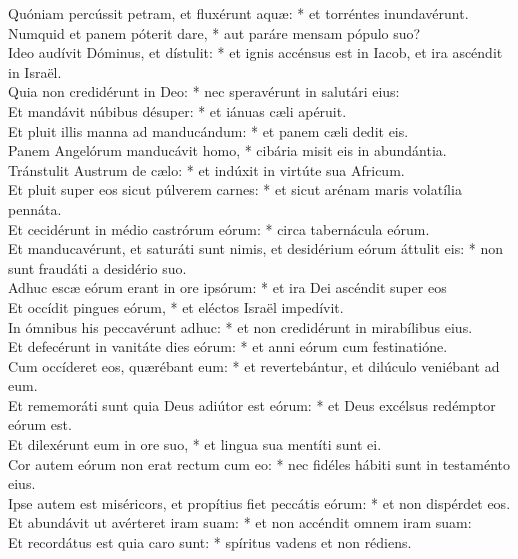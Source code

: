 {	Quóniam percússit petram, et fluxérunt aquæ: * et torréntes inundavérunt. \\
	Numquid et panem póterit dare, * aut paráre mensam pópulo suo? \\
	Ideo audívit Dóminus, et dístulit: * et ignis accénsus est in Iacob, et ira ascéndit in Israël. \\
	Quia non credidérunt in Deo: * nec speravérunt in salutári eius: \\
	Et mandávit núbibus désuper: * et iánuas cæli apéruit. \\
	Et pluit illis manna ad manducándum: * et panem cæli dedit eis. \\
	Panem Angelórum manducávit homo, * cibária misit eis in abundántia. \\
	Tránstulit Austrum de cælo: * et indúxit in virtúte sua Africum. \\
	Et pluit super eos sicut púlverem carnes: * et sicut arénam maris volatília pennáta. \\
	Et cecidérunt in médio castrórum eórum: * circa tabernácula eórum. \\
	Et manducavérunt, et saturáti sunt nimis, et desidérium eórum áttulit eis: * non sunt fraudáti a desidério suo. \\
	Adhuc escæ eórum erant in ore ipsórum: * et ira Dei ascéndit super eos \\
	Et occídit pingues eórum, * et eléctos Israël impedívit. \\
	In ómnibus his peccavérunt adhuc: * et non credidérunt in mirabílibus eius. \\
	Et defecérunt in vanitáte dies eórum: * et anni eórum cum festinatióne. \\
	Cum occíderet eos, quærébant eum: * et revertebántur, et dilúculo veniébant ad eum. \\
	Et rememoráti sunt quia Deus adiútor est eórum: * et Deus excélsus redémptor eórum est. \\
	Et dilexérunt eum in ore suo, * et lingua sua mentíti sunt ei. \\
	Cor autem eórum non erat rectum cum eo: * nec fidéles hábiti sunt in testaménto eius. \\
	Ipse autem est miséricors, et propítius fiet peccátis eórum: * et non dispérdet eos. \\
	Et abundávit ut avérteret iram suam: * et non accéndit omnem iram suam: \\
	Et recordátus est quia caro sunt: * spíritus vadens et non rédiens. \\
}
